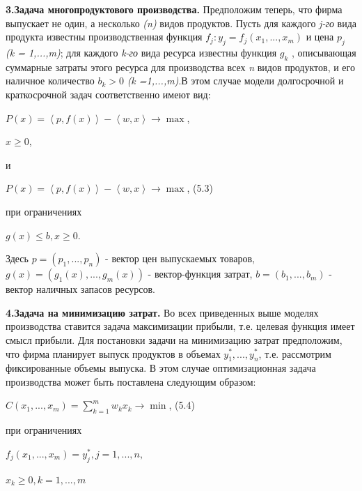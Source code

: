 \documentclass[12pt, 4paper]{book}
\begin{document}
{\textbf{3.Задача многопродуктового производства.} Предположим теперь, что фирма выпускает не один, а несколько \textit{(n)} видов продуктов. Пусть для каждого \textit{j-го} вида продукта известны производственная функция $f_j : y_j = f_j(x_1,...,x_m)$ и цена $p_j$ \textit{(k = 1,...,m)}; для каждого \textit{k-го} вида ресурса известны функция $g_k$ , описывающая суммарные затраты этого ресурса для производства всех \textit{n} видов продуктов, и его наличное количество $b_k > 0$ \textit{(k =1,...,m)}.В этом случае модели долгосрочной и краткосрочной задач соответственно имеют вид: 
\begin{center}
$P(x)=\left\langle p,f(x)\right\rangle - \left\langle  w,x \right\rangle \rightarrow \max$,
\end{center}
\begin{center}
$x \geq 0$,
\end{center}
и
\begin{center}
$P(x)=\left\langle p,f(x)\right\rangle - \left\langle w,x \right\rangle \rightarrow \max$, (5.3)
\end{center}
при ограничениях
\begin{center}
$g(x) \leq b, x \geq 0$.
\end{center}
\par

Здесь $p = (p_1,...,p_n)$ - вектор цен выпускаемых товаров, $g(x) =(g_1(x),...,g_m(x))$ - вектор-функция затрат, $b=(b_1,...,b_m)$  - вектор наличных запасов ресурсов. 
\par

\textbf{4.Задача на минимизацию затрат.} Во всех приведенных выше моделях производства ставится задача максимизации прибыли, т.е. целевая функция имеет смысл прибыли. Для постановки задачи на минимизацию затрат предположим, что фирма планирует выпуск продуктов в объемах $y_{1}^{*},...,y_{n}^{*}$, т.е. рассмотрим фиксированные объемы выпуска. В этом случае оптимизационная задача производства может быть поставлена следующим образом: 
\begin{center}
$C(x_1,...,x_m) = \sum\limits_{k=1}^{m}w_k x_k \rightarrow \min$, (5.4)
\end{center}
при ограничениях
\begin{center}
$f_j(x_1,...,x_m)=y_{j}^{*}, j=1,...,n,$
\end{center}
\begin{center}
$x_k \geq 0, k=1,...,m$
\end{center}
\par

}
\end{document}
